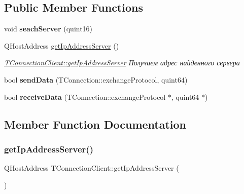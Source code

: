 \subsection*{Public Member Functions}
\begin{DoxyCompactItemize}
\item 
\mbox{\label{class_t_connection_client_ad2074cdebc8cc41b0fe9227c032f6623}} 
void {\bfseries seach\+Server} (quint16)
\item 
Q\+Host\+Address \hyperlink{class_t_connection_client_afa458e30889d97faa2f1f8d9ee41e97e}{get\+Ip\+Address\+Server} ()
\begin{DoxyCompactList}\small\item\em \hyperlink{class_t_connection_client_afa458e30889d97faa2f1f8d9ee41e97e}{T\+Connection\+Client\+::get\+Ip\+Address\+Server} Получаем адрес найденного сервера \end{DoxyCompactList}\item 
\mbox{\label{class_t_connection_client_aec929bf022935eddb052abd230444d72}} 
bool {\bfseries send\+Data} (T\+Connection\+::exchange\+Protocol, quint64)
\item 
\mbox{\label{class_t_connection_client_a7aa687e64ae0c13ee20f148e8453990b}} 
bool {\bfseries receive\+Data} (T\+Connection\+::exchange\+Protocol $\ast$, quint64 $\ast$)
\end{DoxyCompactItemize}


\subsection{Member Function Documentation}
\mbox{\label{class_t_connection_client_afa458e30889d97faa2f1f8d9ee41e97e}} 
\subsubsection{\texorpdfstring{get\+Ip\+Address\+Server()}{getIpAddressServer()}}
{\footnotesize\ttfamily Q\+Host\+Address T\+Connection\+Client\+::get\+Ip\+Address\+Server (\begin{DoxyParamCaption}{ }\end{DoxyParamCaption})}



